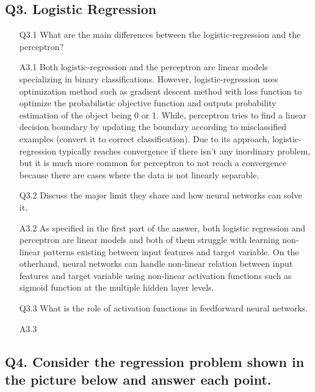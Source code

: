 \documentclass[11pt]{scrartcl}
\begin{document}
\subsection*{Q3. Logistic Regression}
\begin{itemize}
\item[Q3.1] What are the main differences between the logistic-regression and the perceptron?
\item[A3.1] Both logistic-regression and the perceptron are linear models specializing in binary classifications. However, logistic-regression uses optimization method such as gradient descent method with loss function to optimize the probabilistic objective function and outputs probability estimation of the object being 0 or 1. While, perceptron tries to find a linear decision boundary by updating the boundary according to misclassified examples (convert it to correct classification). Due to its approach, logistic-regression typically reaches convergence if there isn't any inordinary problem, but it is much more common for perceptron to not reach a convergence because there are cases where the data is not linearly separable. \\

\item[Q3.2] Discuss the major limit they share and how neural networks can solve it.
\item[A3.2] As specified in the first part of the answer, both logistic regression and perceptron are linear models and both of them struggle with learning non-linear patterns existing between input features and target variable. On the otherhand, neural networks can handle non-linear relation between input features and target variable using non-linear activation functions such as sigmoid function at the multiple hidden layer levels.\\

\item[Q3.3] What is the role of activation functions in feedforward neural networks.
\item[A3.3] ~\\
\end{itemize}
\subsection*{Q4. Consider the regression problem shown in the picture below and answer each point.}
\end{document}
